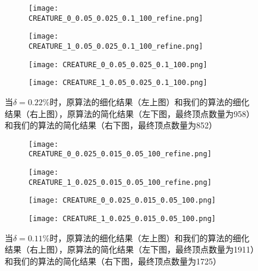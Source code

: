 \begin{figure}[htbp]
  \centering
  \begin{subfigure}[b]{0.4\textwidth}
    \texttt{[image: CREATURE\_0\_0.05\_0.025\_0.1\_100\_refine.png]}
  \end{subfigure}
  \begin{subfigure}[b]{0.4\textwidth}
    \texttt{[image: CREATURE\_1\_0.05\_0.025\_0.1\_100\_refine.png]}
  \end{subfigure}
  \begin{subfigure}[b]{0.4\textwidth}
    \texttt{[image: CREATURE\_0\_0.05\_0.025\_0.1\_100.png]}
  \end{subfigure}
  \begin{subfigure}[b]{0.4\textwidth}
    \texttt{[image: CREATURE\_1\_0.05\_0.025\_0.1\_100.png]}
  \end{subfigure}
  \caption[当$\delta=0.22\%$时banana结果对比]{当$\delta=0.22\%$时，原算法的细化结果（左上图）和我们的算法的细化结果（右上图），原算法的简化结果（左下图，最终顶点数量为958）和我们的算法的简化结果（右下图，最终顶点数量为852）}
  \label{fig:creature-res1}
\end{figure}

\begin{figure}[htbp]
  \centering
  \begin{subfigure}[b]{0.4\textwidth}
    \texttt{[image: CREATURE\_0\_0.025\_0.015\_0.05\_100\_refine.png]}
  \end{subfigure}
  \begin{subfigure}[b]{0.4\textwidth}
    \texttt{[image: CREATURE\_1\_0.025\_0.015\_0.05\_100\_refine.png]}
  \end{subfigure}
  \begin{subfigure}[b]{0.4\textwidth}
    \texttt{[image: CREATURE\_0\_0.025\_0.015\_0.05\_100.png]}
  \end{subfigure}
  \begin{subfigure}[b]{0.4\textwidth}
    \texttt{[image: CREATURE\_1\_0.025\_0.015\_0.05\_100.png]}
  \end{subfigure}
  \caption[当$\delta=0.11\%$时banana结果对比]{当$\delta=0.11\%$时，原算法的细化结果（左上图）和我们的算法的细化结果（右上图），原算法的简化结果（左下图，最终顶点数量为1911）和我们的算法的简化结果（右下图，最终顶点数量为1725）}
  \label{fig:creature-res2}
\end{figure}

